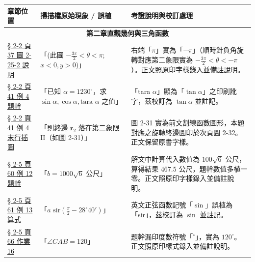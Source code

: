 \documentclass[a4paper,12pt,twoside]{article}
\begin{document}
\begin{table}[H]
\centering
\small
\renewcommand{\arraystretch}{1.35}
\begin{tabularx}{\textwidth}{|p{3.0cm}|p{3.8cm}|X|}
\hline
\textbf{章節位置} & \textbf{掃描檔原始現象 / 誤植} & \textbf{考證說明與校訂處理} \\ \hline

\multicolumn{3}{|c|}{\textbf{第二章\quad 直觀幾何與三角函數}} \\ \hline

\hyperref[note:b3-ch2-p37-fig2-25-2]{§ 2-2 頁 37 圖 2-25-2 說明} & 
「(此圖 $-\frac{3\pi}{2} < \theta < \pi$; $x<0, y>0$)」 & 
右端「$\pi$」實為「$-\pi$」（順時針負角旋轉對應第二象限實為 $-\frac{3\pi}{2} < \theta < -\pi$）。正文照原印字樣錄入並備註說明。 \\ \hline

\hyperref[note:b3-ch2-p41-ex4-typo]{§ 2-2 頁 41 例 4 題幹} & 
「已知 $\alpha = 1230^\circ$，求 $\sin\alpha, \cos\alpha, \text{tara }\alpha$ 之值」 & 
「tara $\alpha$」顯為「$\tan\alpha$」之印刷訛字，茲校訂為 $\tan\alpha$ 並註記。 \\ \hline

\hyperref[note:b3-ch2-p41-ref-fig31]{§ 2-2 頁 41 例 4 末行插圖} & 
「則終邊 $\mathbf{r}_2$ 落在第二象限 $\mathrm{II}$（如圖 2-31）」 & 
圖 2-31 實為前文割線函數圖形，本題對應之旋轉終邊圖印於次頁圖 2-32。正文保留原書字樣。 \\ \hline

\hyperref[note:b3-ch2-p60-ex12-data]{§ 2-5 頁 60 例 12 題幹} & 
「$b = 1000\sqrt{6}$ 公尺」 & 
解文中計算代入數值為 $100\sqrt{6}$ 公尺，算得結果 $467.5$ 公尺，題幹數值多植一零。正文照原印字樣錄入並備註說明。 \\ \hline

\hyperref[note:b3-ch2-p61-ex13-sir]{§ 2-5 頁 61 例 13 算式} & 
「$a\text{ sir}(\frac{\pi}{2} - 28^\circ 40')$」 & 
英文正弦函數記號「$\sin$」誤植為「sir」，茲校訂為 $\sin$ 並註記。 \\ \hline

\hyperref[note:b3-ch2-p66-homework16-deg]{§ 2-5 頁 66 作業 16} & 
「$\angle CAB = 120$」 & 
題幹漏印度數符號「$^\circ$」，實為 $120^\circ$。正文照原印樣式錄入並備註說明。 \\ \hline

\end{tabularx}
\end{table}
\end{document}
